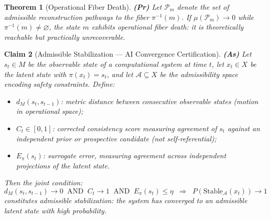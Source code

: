 \documentclass[11pt, a4paper]{book}
\theoremstyle{flyxion}
\newtheorem{theorem}{Theorem}[chapter]
\newtheorem{claim}[theorem]{Claim}
\theoremstyle{remark}
\begin{document}
\begin{theorem}[Operational Fiber Death] \textbf{(Pr)}
Let $\mathcal{P}_m$ denote the set of admissible reconstruction
pathways to the fiber $\pi^{-1}(m)$. If $\mu(\mathcal{P}_m) \to 0$
while $\pi^{-1}(m) \neq \varnothing$, the state $m$ exhibits
operational fiber death: it is theoretically reachable but
practically unrecoverable.
\end{theorem}

\begin{claim}[Admissible Stabilization --- AI Convergence Certification]
\textbf{(As)}
\label{claim:ai-cert}
Let $s_t \in M$ be the observable state of a computational system
at time $t$, let $x_t \in X$ be the latent state with
$\pi(x_t) = s_t$, and let $\mathcal{A} \subseteq X$ be the
admissibility space encoding safety constraints. Define:
\begin{itemize}
\item $d_M(s_t, s_{t-1})$: metric distance between consecutive
  observable states (motion in operational space);
\item $C_t \in [0,1]$: corrected consistency score measuring
  agreement of $s_t$ against an independent prior or prospective
  candidate (not self-referential);
\item $E_\pi(s_t)$: surrogate error, measuring agreement across
  independent projections of the latent state.
\end{itemize}
Then the joint condition:
\[
d_M(s_t, s_{t-1}) \to 0
\;\;\text{AND}\;\;
C_t \to 1
\;\;\text{AND}\;\;
E_\pi(s_t) \leq \eta
\;\;\Longrightarrow\;\;
P\!\left(\mathrm{Stable}_{\mathcal{A}}(x_t)\right) \to 1
\]
constitutes \emph{admissible stabilization}: the system has
converged to an admissible latent state with high probability.
\end{claim}
\end{document}
